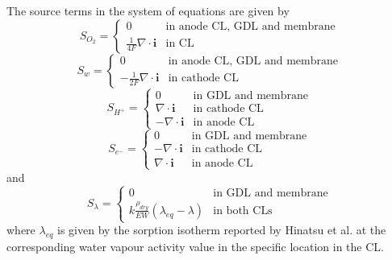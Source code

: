 \documentclass[]{elsart}
\renewcommand{\vec}[1]{\mathbf{#1}}
\begin{document}
The source terms in the system of equations are given by
\begin{equation}
S_{O_2} = \left\{
\begin{array}{cl}
	0 &\text{in anode CL, GDL and membrane} \\
	\frac{1}{4F}\nabla \cdot \vec{i} &\text{in CL}
\end{array}
\right.
\end{equation}
\begin{equation}
S_{w} = \left\{
\begin{array}{cl}
	0 &\text{in anode CL, GDL and membrane} \\
	-\frac{1}{2F}\nabla \cdot \vec{i} &\text{in cathode CL}
\end{array}
\right.
\end{equation}
\begin{equation}
S_{H^+} = \left\{
\begin{array}{cl}
	0 &\text{in GDL and membrane} \\
	\nabla \cdot \vec{i} &\text{in cathode CL} \\
	- \nabla \cdot \vec{i} &\text{in anode CL}
\end{array}
\right.
\end{equation}
\begin{equation}
S_{e^-} = \left\{
\begin{array}{cl}
	0 &\text{in GDL and membrane} \\
	-\nabla \cdot \vec{i} &\text{in cathode CL} \\
	\nabla \cdot \vec{i} &\text{in anode CL}
\end{array}
\right.
\end{equation}
and
\begin{equation}
S_{\lambda} = \left\{
\begin{array}{cl}
	0 &\text{in GDL and membrane} \\
	k\frac{\rho_{dry}}{EW}(\lambda_{eq} - \lambda) &\text{in both CLs}
\end{array}
\right.
\end{equation}
where $\lambda_{eq}$ is given by the sorption isotherm reported by Hinatsu et al. \cite{Hinatsu94} at the corresponding water vapour activity value in the specific location in the CL.
\end{document}

